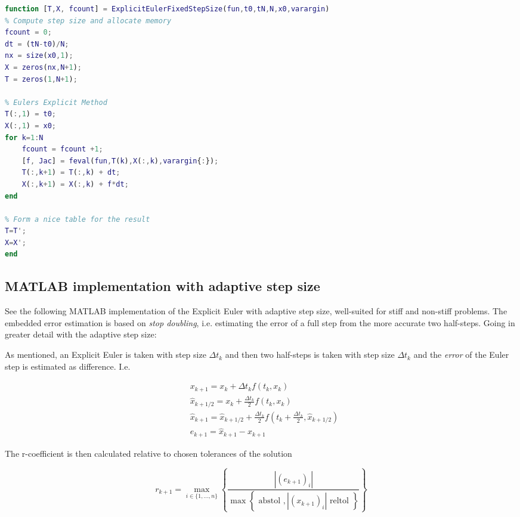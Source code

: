 \begin{adjustwidth*}{0cm}{-0.4cm}
\begin{lstlisting}[frame=single, language=Matlab,caption=Explicit Euler (fixed step size), label=ExplicitEulerFixie]
function [T,X, fcount] = ExplicitEulerFixedStepSize(fun,t0,tN,N,x0,varargin)
% Compute step size and allocate memory
fcount = 0;
dt = (tN-t0)/N;
nx = size(x0,1);
X = zeros(nx,N+1);
T = zeros(1,N+1);

% Eulers Explicit Method
T(:,1) = t0;
X(:,1) = x0;
for k=1:N
    fcount = fcount +1;
    [f, Jac] = feval(fun,T(k),X(:,k),varargin{:});
    T(:,k+1) = T(:,k) + dt;
    X(:,k+1) = X(:,k) + f*dt;
end

% Form a nice table for the result
T=T';
X=X';
end
\end{lstlisting}
\end{adjustwidth*}

\subsection{MATLAB implementation with adaptive step size}
\label{sec:ExplicitEulerAdaptive}
See the following MATLAB implementation of the Explicit Euler with adaptive step size, well-suited for stiff and non-stiff problems. The embedded error estimation is based on \textit{stop doubling}, i.e. estimating the error of a full step from the more accurate two half-steps. Going in greater detail with the adaptive step size:

As mentioned, an Explicit Euler is taken with step size $\Delta {t_k}$ and then two half-steps is taken with step size $\Delta t_k$ and the \textit{error} of the Euler step is estimated as difference. I.e. 

\begin{equation}
\begin{aligned}
&x_{k+1}=x_{k}+\Delta t_k f\left(t_{k}, x_{k}\right) \\
&\hat{x}_{k+1 / 2}=x_{k}+\frac{\Delta t_k}{2} f\left(t_{k}, x_{k}\right) \\
&\hat{x}_{k+1}=\hat{x}_{k+1 / 2}+\frac{\Delta t_k}{2} f\left(t_{k}+\frac{\Delta t_k}{2}, \hat{x}_{k+1 / 2}\right) \\
&e_{k+1}=\hat{x}_{k+1}-x_{k+1}
\end{aligned}
\end{equation}

The r-coefficient is then calculated relative to chosen tolerances of the solution

\begin{equation}
r_{k+1}=\max _{i \in\{1, \ldots, n\}}\left\{\frac{\left|\left(e_{k+1}\right)_{i}\right|}{\max \left\{\text { abstol },\left|\left(x_{k+1}\right)_{i}\right| \text { reltol }\right\}}\right\}
\end{equation}

